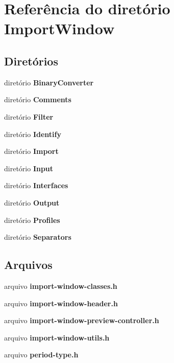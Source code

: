\section{Referência do diretório Import\+Window}
\label{dir_12b42e88be487139f02c78b92fad5e8a}
\subsection*{Diretórios}
\begin{DoxyCompactItemize}
\item 
diretório {\bf Binary\+Converter}
\item 
diretório {\bf Comments}
\item 
diretório {\bf Filter}
\item 
diretório {\bf Identify}
\item 
diretório {\bf Import}
\item 
diretório {\bf Input}
\item 
diretório {\bf Interfaces}
\item 
diretório {\bf Output}
\item 
diretório {\bf Profiles}
\item 
diretório {\bf Separators}
\end{DoxyCompactItemize}
\subsection*{Arquivos}
\begin{DoxyCompactItemize}
\item 
arquivo {\bf import-\/window-\/classes.\+h}
\item 
arquivo {\bf import-\/window-\/header.\+h}
\item 
arquivo {\bf import-\/window-\/preview-\/controller.\+h}
\item 
arquivo {\bf import-\/window-\/utils.\+h}
\item 
arquivo {\bf period-\/type.\+h}
\end{DoxyCompactItemize}
